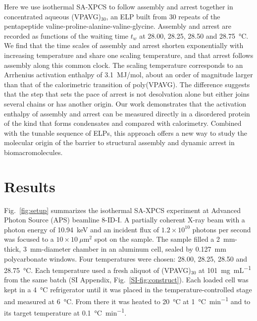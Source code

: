 \documentclass[journal=nalefd,manuscript=letter,layout=traditional]{achemso}
\newcommand{\VPAVG}{(VPAVG)$_{30}$}
\begin{document}
Here we use isothermal SA-XPCS to follow assembly and arrest together in concentrated aqueous \VPAVG, an ELP built from 30 repeats of the pentapeptide valine-proline-alanine-valine-glycine. Assembly and arrest are recorded as functions of the waiting time $t_w$ at 28.00, 28.25, 28.50 and \SI{28.75}{\degreeCelsius}. We find that the time scales of assembly and arrest shorten exponentially with increasing temperature and share one scaling temperature, and that arrest follows assembly along this common clock. The scaling temperature corresponds to an Arrhenius activation enthalpy of 3.1~MJ/mol, about an order of magnitude larger than that of the calorimetric transition of poly(VPAVG). The difference suggests that the step that sets the pace of arrest is not desolvation alone but either joins several chains or has another origin. Our work demonstrates that the activation enthalpy of assembly and arrest can be measured directly in a disordered protein of the kind that forms condensates and compared with calorimetry. Combined with the tunable sequence of ELPs, this approach offers a new way to study the molecular origin of the barrier to structural assembly and dynamic arrest in biomacromolecules.

\section*{Results}
Fig.~\ref{fig:setup} summarizes the isothermal SA-XPCS experiment at Advanced Photon Source (APS) beamline 8-ID-I. A partially coherent X-ray beam with a photon energy of \SI{10.94}{\kilo\electronvolt} and an incident flux of $1.2\times10^{10}$ photons per second was focused to a $10\times10~\mu\mathrm{m}^2$ spot on the sample. The sample filled a \SI{2}{\milli\meter}-thick, \SI{3}{\milli\meter}-diameter chamber in an aluminum cell, sealed by \SI{0.127}{\milli\meter} polycarbonate windows. Four temperatures were chosen: 28.00, 28.25, 28.50 and \SI{28.75}{\degreeCelsius}. Each temperature used a fresh aliquot of \VPAVG{} at \SI{101}{\milli\gram\per\milli\liter} from the same batch (SI Appendix, Fig.~\ref*{SI-fig:construct}). Each loaded cell was kept in a \SI{4}{\degreeCelsius} refrigerator until it was placed in the temperature-controlled stage and measured at \SI{6}{\degreeCelsius}. From there it was heated to \SI{20}{\degreeCelsius} at \SI{1}{\degreeCelsius\per\minute} and to its target temperature at \SI{0.1}{\degreeCelsius\per\minute}. 
\end{document}
